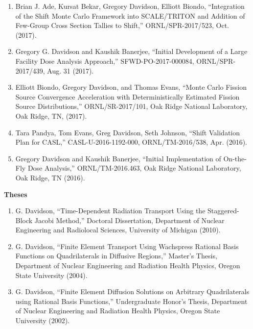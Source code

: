 \documentclass[letterpaper,11pt]{article}
\newcommand{\leftsubheading}[1]{
  \textbf{#1\vspace{-6pt} \\}}
\begin{document}
\begin{enumerate}
  \item Brian J. Ade, Kursat Bekar, Gregory Davidson, Elliott
    Biondo, ``Integration of the Shift Monte Carlo Framework into
    SCALE/TRITON and Addition of Few-Group Cross Section Tallies to
    Shift,'' ORNL/SPR-2017/523, Oct. (2017).
  \item Gregory G. Davidson and Kaushik Banerjee, ``Initial
    Development of a Large Facility Dose Analysis Approach,''
    SFWD-PO-2017-000084, ORNL/SPR-2017/439, Aug. 31 (2017).
  \item Elliott Biondo, Gregory Davidson, and Thomas Evans, ``Monte
    Carlo Fission Source Convergence Acceleration with
    Deterministically Estimated Fission Source Distributions,''
    ORNL/SR-2017/101, Oak Ridge National Laboratory, Oak Ridge, TN,
    (2017).
  \item Tara Pandya, Tom Evans, Greg Davidson, Seth Johnson, ``Shift
    Validation Plan for CASL,'' CASL-U-2016-1192-000,
    ORNL/TM-2016/538, Apr. (2016).
  \item Gregory Davidson and Kaushik Banerjee, ``Initial
    Implementation of On-the-Fly Dose Analysis,'' ORNL/TM-2016.463,
    Oak Ridge National Laboratory, Oak Ridge, TN (2016).
\end{enumerate}


\leftsubheading{Theses}
\begin{enumerate}
  \item G. Davidson, ``Time-Dependent Radiation Transport Using the
    Staggered-Block Jacobi Method,'' Doctoral Dissertation, Department
    of Nuclear Engineering and Radiolocal Sciences, University of
    Michigan (2010).
  \item G. Davidson, ``Finite Element Transport Using Wachspress
    Rational Basis Functions on Quadrilaterals in Diffusive Regions,''
    Master's Thesis, Department of Nuclear Engineering and Radiation
    Health Physics, Oregon State University (2004).
  \item G. Davidson, ``Finite Element Diffusion Solutions on Arbitrary
    Quadrilaterals using Rational Basis Functions,'' Undergraduate
    Honor's Thesis, Department of Nuclear Engineering and Radiation
    Health Physics, Oregon State University (2002).
\end{enumerate}

\end{document}
